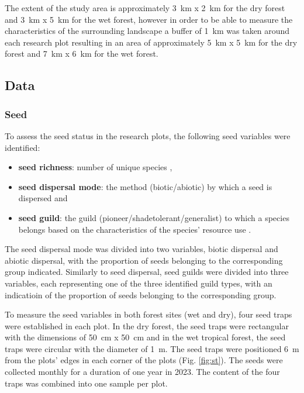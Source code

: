 The extent of the study area is approximately 3~km x 2~km for the dry forest and 3~km x 5~km for the wet forest, however in order to be able to measure the characteristics of the surrounding landscape a buffer of 1~km was taken around each research plot resulting in an area of approximately 5~km x 5~km for the dry forest and 7~km x 6~km for the wet forest.

\subsection{Data}

\subsubsection{Seed}
To assess the seed status in the research plots, the following seed variables were identified:
\begin{itemize}
    \item \textbf{seed richness}: number of unique species \citep{butlerSpeciesRichnessSpatial1998}, 
    \item \textbf{seed dispersal mode}: the method (biotic/abiotic) by which a seed is dispersed \citep{dentUnitingNicheDifferentiation2021} and 
    \item \textbf{seed guild}: the guild (pioneer/shadetolerant/generalist) to which a species belongs based on the characteristics of the species' resource use \citep{blondelGuildsFunctionalGroups2003}. 
\end{itemize}

The seed dispersal mode was divided into two variables, biotic dispersal and abiotic dispersal, with the proportion of seeds belonging to the corresponding group indicated. Similarly to seed dispersal, seed guilds were divided into three variables, each representing one of the three identified guild types, with an indicatioin of the proportion of seeds belonging to the corresponding group.

To measure the seed variables in both forest sites (wet and dry), four seed traps were established in each plot. In the dry forest, the seed traps were rectangular with the dimensions of 50~cm x 50~cm and in the wet tropical forest, the seed traps were circular with the diameter of 1~m. The seed traps were positioned 6~m from the plots’ edges in each corner of the plots (Fig. \ref{fig:st}). The seeds were collected monthly for a duration of one year in 2023. The content of the four traps was combined into one sample per plot.

